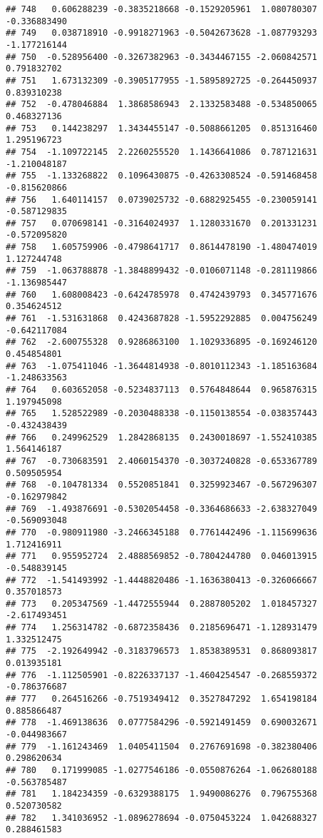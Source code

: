 \documentclass[
]{article}
\begin{document}
\begin{verbatim}
## 748   0.606288239 -0.3835218668 -0.1529205961  1.080780307 -0.336883490
## 749   0.038718910 -0.9918271963 -0.5042673628 -1.087793293 -1.177216144
## 750  -0.528956400 -0.3267382963 -0.3434467155 -2.060842571  0.791832702
## 751   1.673132309 -0.3905177955 -1.5895892725 -0.264450937  0.839310238
## 752  -0.478046884  1.3868586943  2.1332583488 -0.534850065  0.468327136
## 753   0.144238297  1.3434455147 -0.5088661205  0.851316460  1.295196723
## 754  -1.109722145  2.2260255520  1.1436641086  0.787121631 -1.210048187
## 755  -1.133268822  0.1096430875 -0.4263308524 -0.591468458 -0.815620866
## 756   1.640114157  0.0739025732 -0.6882925455 -0.230059141 -0.587129835
## 757   0.070698141 -0.3164024937  1.1280331670  0.201331231 -0.572095820
## 758   1.605759906 -0.4798641717  0.8614478190 -1.480474019  1.127244748
## 759  -1.063788878 -1.3848899432 -0.0106071148 -0.281119866 -1.136985447
## 760   1.608008423 -0.6424785978  0.4742439793  0.345771676  0.354624512
## 761  -1.531631868  0.4243687828 -1.5952292885  0.004756249 -0.642117084
## 762  -2.600755328  0.9286863100  1.1029336895 -0.169246120  0.454854801
## 763  -1.075411046 -1.3644814938 -0.8010112343 -1.185163684 -1.248633563
## 764   0.603652058 -0.5234837113  0.5764848644  0.965876315  1.197945098
## 765   1.528522989 -0.2030488338 -0.1150138554 -0.038357443 -0.432438439
## 766   0.249962529  1.2842868135  0.2430018697 -1.552410385  1.564146187
## 767  -0.730683591  2.4060154370 -0.3037240828 -0.653367789  0.509505954
## 768  -0.104781334  0.5520851841  0.3259923467 -0.567296307 -0.162979842
## 769  -1.493876691 -0.5302054458 -0.3364686633 -2.638327049 -0.569093048
## 770  -0.980911980 -3.2466345188  0.7761442496 -1.115699636  1.712416911
## 771   0.955952724  2.4888569852 -0.7804244780  0.046013915 -0.548839145
## 772  -1.541493992 -1.4448820486 -1.1636380413 -0.326066667  0.357018573
## 773   0.205347569 -1.4472555944  0.2887805202  1.018457327 -2.617493451
## 774   1.256314782 -0.6872358436  0.2185696471 -1.128931479  1.332512475
## 775  -2.192649942 -0.3183796573  1.8538389531  0.868093817  0.013935181
## 776  -1.112505901 -0.8226337137 -1.4604254547 -0.268559372 -0.786376687
## 777   0.264516266 -0.7519349412  0.3527847292  1.654198184  0.885866487
## 778  -1.469138636  0.0777584296 -0.5921491459  0.690032671 -0.044983667
## 779  -1.161243469  1.0405411504  0.2767691698 -0.382380406  0.298620634
## 780   0.171999085 -1.0277546186 -0.0550876264 -1.062680188 -0.563785487
## 781   1.184234359 -0.6329388175  1.9490086276  0.796755368  0.520730582
## 782   1.341036952 -1.0896278694 -0.0750453224  1.042688327  0.288461583

\end{verbatim}
\end{document}
